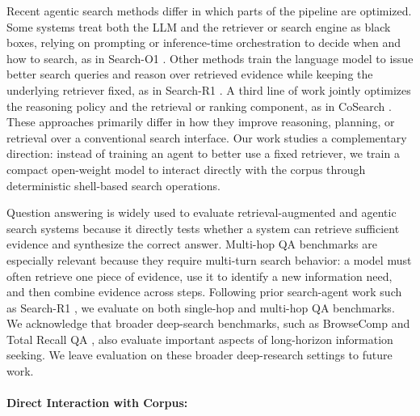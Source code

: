 \documentclass{llmxive}
\begin{document}
Recent agentic search methods differ in which parts of the pipeline are optimized. Some systems treat both the LLM and the retriever or search engine as black boxes, relying on prompting or inference-time orchestration to decide when and how to search, as in Search-O1 \citep{search-o1}. Other methods train the language model to issue better search queries and reason over retrieved evidence while keeping the underlying retriever fixed, as in Search-R1 \citep{search-r1}. A third line of work jointly optimizes the reasoning policy and the retrieval or ranking component, as in CoSearch \citep{zeng2026cosearch}. These approaches primarily differ in how they improve reasoning, planning, or retrieval over a conventional search interface. Our work studies a complementary direction: instead of training an agent to better use a fixed retriever, we train a compact open-weight model to interact directly with the corpus through deterministic shell-based search operations.

Question answering is widely used to evaluate retrieval-augmented and agentic search systems because it directly tests whether a system can retrieve sufficient evidence and synthesize the correct answer. Multi-hop QA benchmarks are especially relevant because they require multi-turn search behavior: a model must often retrieve one piece of evidence, use it to identify a new information need, and then combine evidence across steps. Following prior search-agent work such as Search-R1 \citep{search-r1}, we evaluate on both single-hop and multi-hop QA benchmarks. We acknowledge that broader deep-search benchmarks, such as BrowseComp \citep{wei2025browsecomp} and Total Recall QA \citep{rafiee2026totalrecallqaverifiable}, also evaluate important aspects of long-horizon information seeking. We leave evaluation on these broader deep-research settings to future work.



\paragraph{Direct Interaction with Corpus:} 
\end{document}
